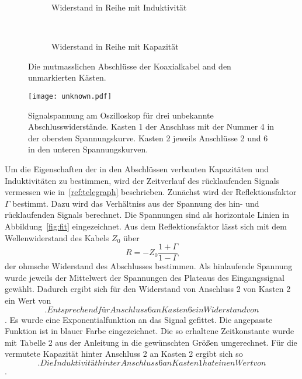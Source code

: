 \begin{figure}
    \centering
    \begin{subfigure}[b]{0.45\textwidth}
        
        \caption{Widerstand in Reihe mit Induktivität}
        \label{fig:end_1}
    \end{subfigure}
    ~ %
    \begin{subfigure}[b]{0.45\textwidth}
        
        \caption{Widerstand in Reihe mit Kapazität}
        \label{fig:end_2}
    \end{subfigure}
    \caption{Die mutmasslichen Abschlüsse der Koaxialkabel and den unmarkierten Kästen.}\label{fig:ends}
\end{figure}


\begin{figure}
  \centering
  \texttt{[image: unknown.pdf]}
  \caption{%
    Signalspannung am Oszilloskop für drei unbekannte Abschlusswiderstände.
    Kasten 1 der Anschluss mit der Nummer 4 in der obersten Spannungskurve. Kasten 2 jeweils Anschlüsse 2 und 6 in den
    unteren Spannungskurven.
  }\label{fig:unknown}
\end{figure}


Um die Eigenschaften der in den Abschlüssen verbauten Kapazitäten und Induktivitäten zu bestimmen,
wird der Zeitverlauf des rücklaufenden Signals vermessen wie in~\ref{ref:telegraph} beschrieben. Zunächst wird der Reflektionsfaktor $\Gamma$ bestimmt.
Dazu wird das Verhältniss aus der Spannung des hin- und rücklaufenden Signals berechnet. Die Spannungen sind als horizontale Linien in
Abbildung~\ref{fig:fit} eingezeichnet. Aus dem Reflektionsfaktor lässt sich mit dem Wellenwiderstand des Kabels $Z_0$ über
\begin{equation}
  R = - Z_0 \frac{ 1 + \Gamma}{ 1 - \Gamma}
\end{equation}
der ohmsche Widerstand des Abschlusses bestimmen.
Als hinlaufende Spannung wurde jeweils der Mittelwert der Spannungen des Plateaus des Eingangssignal gewählt. Dadurch ergibt sich
für den Widerstand von Anschluss 2 von Kasten 2 ein Wert von $$. Entsprechend für Anschluss 6 an Kasten 6 ein Widerstand
von $$.
Es wurde eine Exponentialfunktion an das Signal gefittet. Die angepasste Funktion ist in blauer Farbe eingezeichnet.
Die so erhaltene Zeitkonstante wurde mit Tabelle 2 aus der Anleitung in die gewünschten Größen umgerechnet.
Für die vermutete Kapazität hinter Anschluss 2 an Kasten 2 ergibt sich so $$.
Die Induktivität hinter Anschluss 6 an Kasten 1 hat einen Wert von $$.

